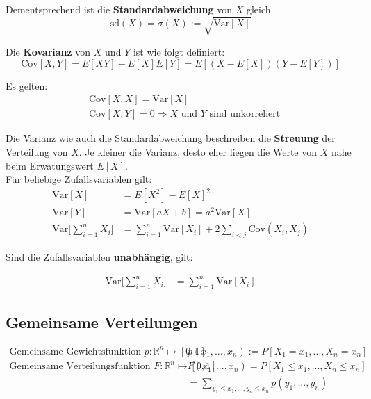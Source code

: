 \documentclass[11pt]{article}
\newcommand{\Var}{\text{Var}}
\newcommand{\Cov}{\text{Cov}}
\begin{document}
Dementsprechend ist die \textbf{Standardabweichung} von $X$ gleich
\begin{equation*}
	\text{sd}(X) = \sigma(X) := \sqrt{\Var[X]}
\end{equation*}

Die \textbf{Kovarianz} von $X$ und $Y$ ist wie folgt definiert:
\begin{equation*}
	\Cov[X,Y] = E[XY] - E[X]E[Y] = E[(X - E[X])(Y-E[Y])]
\end{equation*}

Es gelten:
\begin{equation*}
\begin{split}
	& \Cov[X, X] = \Var[X] \\
	& \Cov[X, Y] = 0 \Rightarrow \text{$X$ und $Y$ sind unkorreliert}
\end{split}
\end{equation*}

Die Varianz wie auch die Standardabweichung beschreiben die \textbf{Streuung} der Verteilung von $X$. Je kleiner die Varianz, desto eher liegen die Werte von $X$ nahe beim Erwatungswert $E[X]$. \\

F{\"u}r beliebige Zufallsvariablen gilt:
\begin{equation*}
\begin{split}
	\Var[X] & = E[X^2] - E[X]^2 \\
	\Var[Y] & = \Var[aX +b] = a^2\Var[X] \\
	\Var\Bigg[\sum_{i=1}^n X_i \Bigg] & = \sum_{i=1}^n\Var[X_i] + 2\sum_{i<j}\Cov(X_i, X_j)
\end{split}	
\end{equation*}

Sind die Zufallsvariablen \textbf{unabh{\"a}ngig}, gilt:

\begin{equation*}
\begin{split}
	\Var\Bigg[\sum_{i=1}^n X_i \Bigg]  & = \sum_{i=1}^n\Var[X_i]
\end{split}
\end{equation*}

\subsection{Gemeinsame Verteilungen}

\begin{equation*}
\begin{split}
	\text{Gemeinsame Gewichtsfunktion } p: \mathbb{R}^n \mapsto [0,1] \qquad & p(x_1,...,x_n) := P[X_1 = x_1,..., X_n = x_n] \\
	\text{Gemeinsame Verteilungsfunktion } F: \mathbb{R}^n \mapsto [0,1] \qquad & F(x_1,...,x_n) = P[X_1 \leq x_1,..., X_n \leq x_n] \\
	& = \sum_{y_1 \leq x_1,...,y_n \leq x_n} p(y_1,...,y_n)
\end{split}
\end{equation*}
\end{document}
